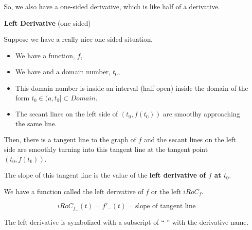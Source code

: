 \documentclass{ximera}
\begin{document}
So, we also have a one-sided derivative, which is like half of a derivative. 











\begin{definition} \textbf{\textcolor{green!50!black}{Left Derivative}}  (one-sided) 


Suppose we have a really nice one-sided situation.


\begin{itemize}
\item We have a function, $f$, 
\item We have and a domain number, $t_0$, 
\item This domain number is inside an interval (half open) inside the domain of the form  $t_0 \in (a, t_0] \subset Domain$. 
\item The secant lines on the left side of $(t_0, f(t_0))$ are smootlhy approaching the same line.
\end{itemize}

Then, there is a tangent line to the graph of $f$ and the secant lines on the left side are smoothly turning into this tangent line at the tangent point $(t_0, f(t_0))$. 

The slope of this tangent line is the value of the \textbf{left derivative of $f$ at $t_0$}. 

We have a function called the left derivative of $f$ or the left $iRoC_f$.

\[
iRoC_{f_{-}}(t) =f'_{-}(t) = \text{slope of tangent line}
\]

The left derivative is symbolized with a subscript of ``-'' with the derivative name. 
 

\end{definition}
\end{document}
